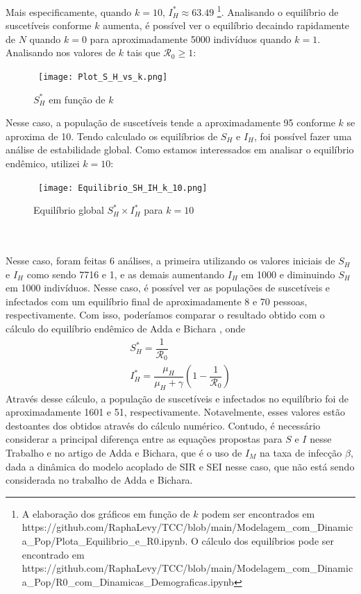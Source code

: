 Mais especificamente, quando $k=10$, $I_H^* \approx 63.49$ \footnote{A elaboração 
dos gráficos em função de $k$ podem ser encontrados em https://github.com/RaphaLevy/TCC/blob/main/Modelagem\_com\_Dinamica\_Pop/Plota\_Equilibrio\_e\_R0.ipynb. 
O cálculo dos equilíbrios pode ser encontrado em
https://github.com/RaphaLevy/TCC/blob/main/Modelagem\_com\_Dinamica\_Pop/R0\_com\_Dinamicas\_Demograficas.ipynb}.
Analisando o equilíbrio de suscetíveis conforme $k$ aumenta, é possível 
ver o equilíbrio decaindo rapidamente
de $N$ quando $k=0$ para aproximadamente 5000 indivíduos quando $k=1$. Analisando 
nos valores de $k$ tais que $\mathcal{R}_0 \geq 1$:
\begin{figure}[!ht]
        \centering
        \hbox{\hspace{4.2em} \texttt{[image: Plot\_S\_H\_vs\_k.png]}}
        \caption{$S_H^*$ em função de $k$}
\end{figure} 
\newpage
Nesse caso, a população de suscetíveis tende a aproximadamente 95 conforme 
$k$ se aproxima de 10. Tendo calculado os equilíbrios de $S_H$ e $I_H$,
foi possível fazer uma análise de estabilidade global. Como estamos interessados
em analisar o equilíbrio endêmico, utilizei $k=10$:
\begin{figure}[!ht]
        \centering
        \hbox{\hspace{2.2em} \texttt{[image: Equilibrio\_SH\_IH\_k\_10.png]}}
        \caption{Equilíbrio global $S_H^* \times I_H^*$ para $k=10$}
\end{figure}
\\\\
Nesse caso, foram feitas 6 análises, a primeira utilizando os
valores iniciais de $S_H$ e $I_H$ como sendo 7716 e 1, e as demais aumentando $I_H$ 
em 1000 e diminuindo $S_H$ em 1000 indivíduos. Nesse caso, é possível
ver as populações de suscetíveis e infectados com um equilíbrio final de
aproximadamente 8 e 70 pessoas, respectivamente. Com isso,
poderíamos comparar o resultado obtido com o cálculo do equilíbrio endêmico de Adda e Bichara
\cite{adda2011global}, onde
\begin{gather*}
        S_H^* = \dfrac{1}{\mathcal{R}_0} \\
        I_H^* = \dfrac{\mu_H}{\mu_H+\gamma}(1-\dfrac{1}{\mathcal{R}_0})
\end{gather*}       
Através desse cálculo, a população de suscetíveis e infectados no equilíbrio 
foi de aproximadamente 1601 e 51, respectivamente. Notavelmente, esses valores 
estão destoantes dos 
obtidos através do cálculo numérico. Contudo, é necessário considerar a principal diferença entre as equações
propostas para $S$ e $I$ nesse Trabalho e no artigo de Adda e Bichara, que é o uso de
$I_M$ na taxa de infecção $\beta$, dada a dinâmica do modelo 
acoplado de SIR e SEI nesse caso, que não está sendo considerada no trabalho
de Adda e Bichara.